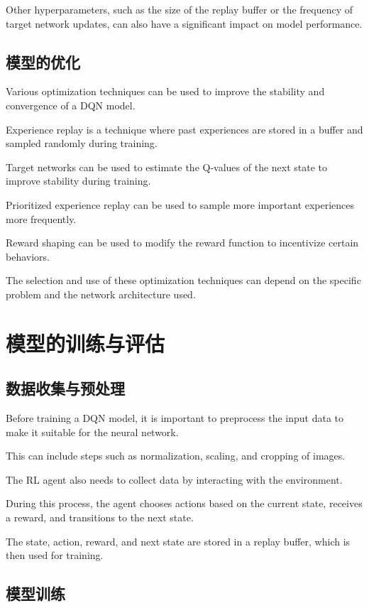 Other hyperparameters, such as the size of the replay buffer or the frequency of target network updates, can also have a significant impact on model performance.

\subsection{模型的优化}

Various optimization techniques can be used to improve the stability and convergence of a DQN model.

Experience replay is a technique where past experiences are stored in a buffer and sampled randomly during training.

Target networks can be used to estimate the Q-values of the next state to improve stability during training.

Prioritized experience replay can be used to sample more important experiences more frequently.

Reward shaping can be used to modify the reward function to incentivize certain behaviors.

The selection and use of these optimization techniques can depend on the specific problem and the network architecture used.

\section{模型的训练与评估}

\subsection{数据收集与预处理}

Before training a DQN model, it is important to preprocess the input data to make it suitable for the neural network.

This can include steps such as normalization, scaling, and cropping of images.

The RL agent also needs to collect data by interacting with the environment.

During this process, the agent chooses actions based on the current state, receives a reward, and transitions to the next state.

The state, action, reward, and next state are stored in a replay buffer, which is then used for training.

\subsection{模型训练}

